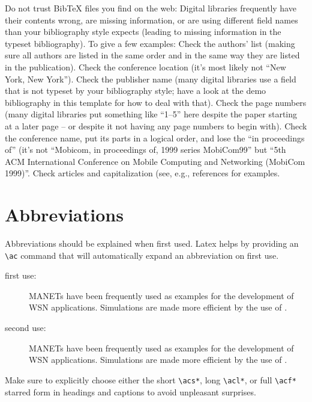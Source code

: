 Do not trust BibTeX files you find on the web:
Digital libraries frequently have their contents wrong, are missing information, or are using different field names than your bibliography style expects (leading to missing information in the typeset bibliography).
To give a few examples:
Check the authors' list (making sure all authors are listed in the same order and in the same way they are listed in the publication).
Check the conference location (it's most likely not \enquote{New York, New York}).
Check the publisher name (many digital libraries use a field that is not typeset by your bibliography style; have a look at the demo bibliography in this template for how to deal with that).
Check the page numbers (many digital libraries put something like \enquote{1--5} here despite the paper starting at a later page -- or despite it not having any page numbers to begin with).
Check the conference name, put its parts in a logical order, and lose the \enquote{in proceedings of} (it's not \enquote{Mobicom, in proceedings of, 1999 series MobiCom99} but \enquote{5th ACM International Conference on Mobile Computing and Networking (MobiCom 1999)}.
Check articles and capitalization (see, e.g., references \cite{nikoli2008would,moulin2021the} for examples.


\clearpage
\section{Abbreviations}

Abbreviations should be explained when first used.
Latex helps by providing an \verb|\ac| command that will automatically expand an abbreviation on first use.

\begin{description}

\item[first use:]
\acp{MANET} have been frequently used as examples for the development of \ac{WSN} applications.
Simulations are made more efficient by the use of .

\item[second use:]
\acp{MANET} have been frequently used as examples for the development of \ac{WSN} applications.
Simulations are made more efficient by the use of .

\end{description}

Make sure to explicitly choose either the short \verb|\acs*|, long \verb|\acl*|, or full \verb|\acf*| starred form in headings and captions to avoid unpleasant surprises.

